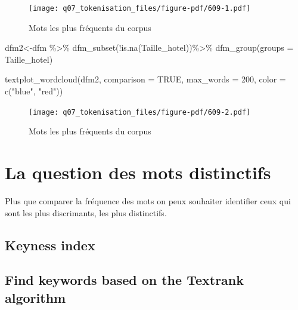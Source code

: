 \documentclass[
  letterpaper,
  DIV=11,
  numbers=noendperiod]{scrreprt}
\newenvironment{Shaded}{\begin{snugshade}}{\end{snugshade}}
\newcommand{\AttributeTok}[1]{\textcolor[rgb]{0.40,0.45,0.13}{#1}}
\newcommand{\ConstantTok}[1]{\textcolor[rgb]{0.56,0.35,0.01}{#1}}
\newcommand{\DecValTok}[1]{\textcolor[rgb]{0.68,0.00,0.00}{#1}}
\newcommand{\FunctionTok}[1]{\textcolor[rgb]{0.28,0.35,0.67}{#1}}
\newcommand{\NormalTok}[1]{\textcolor[rgb]{0.00,0.23,0.31}{#1}}
\newcommand{\OtherTok}[1]{\textcolor[rgb]{0.00,0.23,0.31}{#1}}
\newcommand{\SpecialCharTok}[1]{\textcolor[rgb]{0.37,0.37,0.37}{#1}}
\newcommand{\StringTok}[1]{\textcolor[rgb]{0.13,0.47,0.30}{#1}}
\begin{document}
\begin{figure}[H]

{\centering \texttt{[image: q07\_tokenisation\_files/figure-pdf/609-1.pdf]}

}

\caption{Mots les plus fréquents du corpus}

\end{figure}%

\begin{Shaded}
\begin{Highlighting}[]
\NormalTok{dfm2}\OtherTok{\textless{}{-}}\NormalTok{dfm }\SpecialCharTok{\%\textgreater{}\%} \FunctionTok{dfm\_subset}\NormalTok{(}\SpecialCharTok{!}\FunctionTok{is.na}\NormalTok{(Taille\_hotel))}\SpecialCharTok{\%\textgreater{}\%}
  \FunctionTok{dfm\_group}\NormalTok{(}\AttributeTok{groups =}\NormalTok{ Taille\_hotel)}


\FunctionTok{textplot\_wordcloud}\NormalTok{(dfm2, }\AttributeTok{comparison =} \ConstantTok{TRUE}\NormalTok{, }\AttributeTok{max\_words =} \DecValTok{200}\NormalTok{,}
                   \AttributeTok{color =} \FunctionTok{c}\NormalTok{(}\StringTok{"blue"}\NormalTok{, }\StringTok{"red"}\NormalTok{))}
\end{Highlighting}
\end{Shaded}

\begin{figure}[H]

{\centering \texttt{[image: q07\_tokenisation\_files/figure-pdf/609-2.pdf]}

}

\caption{Mots les plus fréquents du corpus}

\end{figure}%

\section{La question des mots
distinctifs}\label{la-question-des-mots-distinctifs}

Plus que comparer la fréquence des mots on peux souhaiter identifier
ceux qui sont les plus discrimants, les plus distinctifs.

\subsection{Keyness index}\label{keyness-index}

\subsection{Find keywords based on the Textrank
algorithm}\label{find-keywords-based-on-the-textrank-algorithm}
\end{document}
